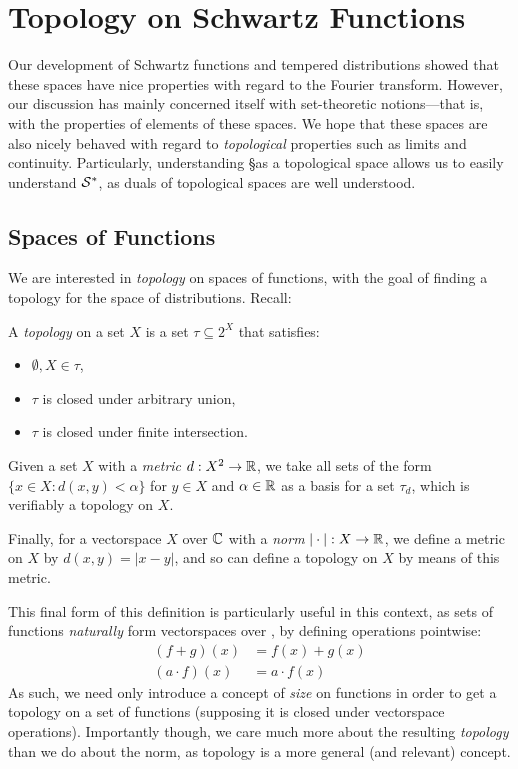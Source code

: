 
  \chapter{Topology on Schwartz Functions}
    \label{ch:topons}
    Our development of Schwartz functions and tempered distributions showed that these spaces have nice properties with regard to the Fourier transform.
    However, our discussion has mainly concerned itself with set-theoretic notions---that is, with the properties of elements of these spaces.
    We hope that these spaces are also nicely behaved with regard to \emph{topological} properties such as limits and continuity.
    Particularly, understanding \S as a topological space allows us to easily understand $\S^*$, as duals of topological spaces are well understood.

    \section{Spaces of Functions}
      We are interested in \emph{topology} on spaces of functions, with the goal of finding a topology for the space of distributions.
      Recall:
      \begin{defn}
        A \emph{topology} on a set $X$ is a set $\tau\subseteq2^X$ that satisfies:
        \begin{itemize}
          \item $\emptyset,X\in\tau$,
          \item $\tau$ is closed under arbitrary union,
          \item $\tau$ is closed under finite intersection.
        \end{itemize}

      Given a set $X$ with a \emph{metric} $d:X^2\rightarrow\R$, we take all sets of the form $\{x\in X:d(x,y)<\alpha\}$ for $y\in X$ and $\alpha\in\R$ as a basis for a set $\tau_d$, which is verifiably a topology on $X$.

      Finally, for a vectorspace $X$ over $\C$ with a \emph{norm} $|\cdot|:X\rightarrow\R$, we define a metric on $X$ by $d(x,y)=|x-y|$, and so can define a topology on $X$ by means of this metric.
      \end{defn}

      This final form of this definition is particularly useful in this context, as sets of functions \emph{naturally} form vectorspaces over \C, by defining operations pointwise:
      \begin{align*}
        (f+g)(x) &= f(x)+g(x)\\
        (a\cdot f)(x) &= a\cdot f(x)
      \end{align*}
      As such, we need only introduce a concept of \emph{size} on functions in order to get a topology on a set of functions (supposing it is closed under vectorspace operations).
      Importantly though, we care much more about the resulting \emph{topology} than we do about the norm, as topology is a more general (and relevant) concept.

